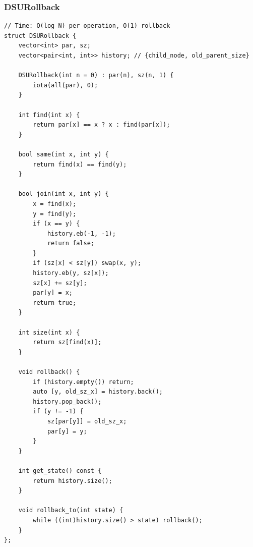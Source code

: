 \documentclass[9pt,a4paper,twocolumn]{extarticle}
\begin{document}
\subsubsection{DSURollback}
\nopagebreak
\begin{lstlisting}
// Time: O(log N) per operation, O(1) rollback
struct DSURollback {
    vector<int> par, sz;
    vector<pair<int, int>> history; // {child_node, old_parent_size}

    DSURollback(int n = 0) : par(n), sz(n, 1) {
        iota(all(par), 0);
    }

    int find(int x) {
        return par[x] == x ? x : find(par[x]);
    }

    bool same(int x, int y) {
        return find(x) == find(y);
    }

    bool join(int x, int y) {
        x = find(x);
        y = find(y);
        if (x == y) {
            history.eb(-1, -1);
            return false;
        }
        if (sz[x] < sz[y]) swap(x, y);
        history.eb(y, sz[x]);
        sz[x] += sz[y];
        par[y] = x;
        return true;
    }

    int size(int x) {
        return sz[find(x)];
    }

    void rollback() {
        if (history.empty()) return;
        auto [y, old_sz_x] = history.back();
        history.pop_back();
        if (y != -1) {
            sz[par[y]] = old_sz_x;
            par[y] = y;
        }
    }

    int get_state() const {
        return history.size();
    }

    void rollback_to(int state) {
        while ((int)history.size() > state) rollback();
    }
};
\end{lstlisting}

\filbreak
\end{document}
